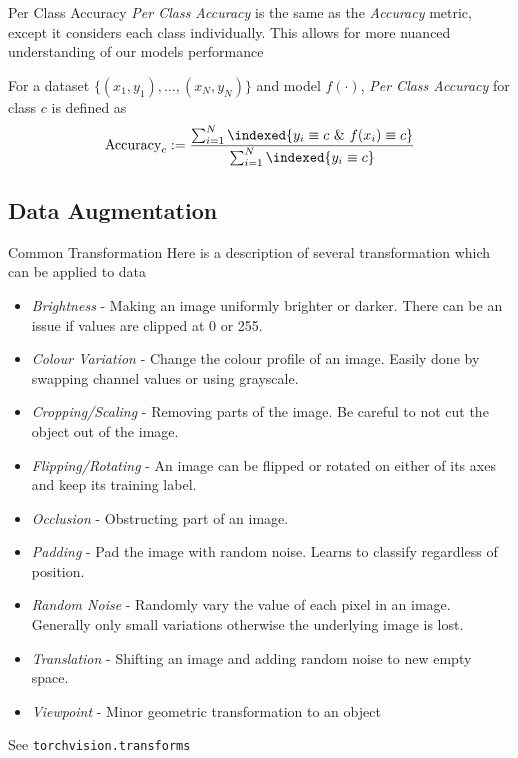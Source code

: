 \documentclass[11pt,a4paper]{article}
\begin{document}
  \begin{definition}{Per Class Accuracy}
    \textit{Per Class Accuracy} is the same as the \textit{Accuracy} metric, except it considers each class individually. This allows for more nuanced understanding of our models performance
    \par For a dataset $\{(x_1,y_1),\dots,(x_N,y_N)\}$ and model $f(\cdot)$, \textit{Per Class Accuracy} for class $c$ is defined as
    \[ \text{Accuracy}_c:=\frac{\sum_{i=1}^N\indexed\{y_i\equiv c\ \&\ f(x_i)\equiv c\}}{\sum_{i=1}^N\indexed\{y_i\equiv c\}} \]
  \end{definition}

\subsection{Data Augmentation} \label{sec_DataAugmentation}

  \begin{definition}{Common Transformation}
    Here is a description of several transformation which can be applied to data
    \begin{itemize}
      \item \textit{Brightness} - Making an image uniformly brighter or darker. There can be an issue if values are clipped at 0 or 255.
      \item \textit{Colour Variation} - Change the colour profile of an image. Easily done by swapping channel values or using grayscale.
      \item \textit{Cropping/Scaling} - Removing parts of the image. Be careful to not cut the object out of the image.
      \item \textit{Flipping/Rotating} - An image can be flipped or rotated on either of its axes and keep its training label.
      \item \textit{Occlusion} - Obstructing part of an image.
      \item \textit{Padding} - Pad the image with random noise. Learns to classify regardless of position.
      \item \textit{Random Noise} - Randomly vary the value of each pixel in an image. Generally only small variations otherwise the underlying image is lost.
      \item \textit{Translation} - Shifting an image and adding random noise to new empty space.
      \item \textit{Viewpoint} - Minor geometric transformation to an object
    \end{itemize}
    See \texttt{torchvision.transforms}
  \end{definition}
\end{document}
